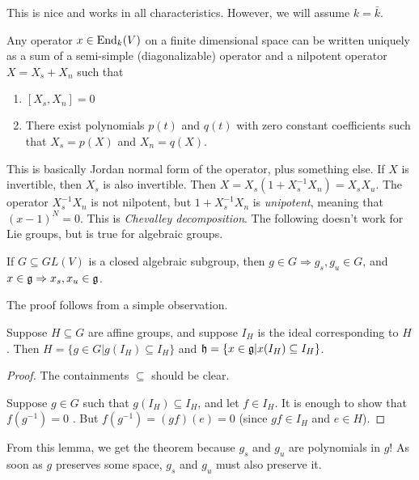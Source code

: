 This is nice and works in all characteristics. However, we will assume $k=\bar k$.
\begin{theorem}
 Any operator $x\in \operatorname{End}_k(V)$ on a finite dimensional space can be written uniquely as a sum of a semi-simple (diagonalizable) operator and a nilpotent operator $X=X_s+X_n$ such that
 \begin{enumerate}
  \item $[X_s,X_n]=0$
  \item There exist polynomials $p(t)$ and $q(t)$ with zero constant coefficients such that $X_s=p(X)$ and $X_n=q(X)$.
 \end{enumerate}
\end{theorem}
This is basically Jordan normal form of the operator, plus something else. If $X$ is invertible, then $X_s$ is also invertible. Then $X=X_s(1+X_s^{-1}X_n)=X_sX_u$. The operator $X_s^{-1}X_n$ is not nilpotent, but $1+X_s^{-1}X_n$ is \emph{unipotent}, meaning that $(x-1)^N=0$. This is \emph{Chevalley decomposition}. The following doesn't work for Lie groups, but is true for algebraic groups.
\begin{theorem}
 If $G\subseteq GL(V)$ is a closed algebraic subgroup, then $g\in G\Rightarrow g_s,g_u\in G$, and $x\in \mathfrak{g}\Rightarrow x_s,x_u\in \mathfrak{g}$.
\end{theorem}
The proof follows from a simple observation.
\begin{lemma}
 Suppose $H\subseteq G$ are affine groups, and suppose $I_H$ is the ideal corresponding to $H$. Then $H=\{g\in G|g(I_H)\subseteq I_H\}$ and $\mathfrak{h}=\{x\in \mathfrak{g}|x(I_H)\subseteq I_H\}$.
\end{lemma}
\begin{proof}
 The containments $\subseteq$ should be clear.
 
 Suppose $g\in G$ such that $g(I_H)\subseteq I_H$, and let $f\in I_H$. It is enough to show that $f(g^{-1})=0$ . But $f(g^{-1})=(gf)(e)=0$ (since $gf\in I_H$ and $e\in H$).
\end{proof}
From this lemma, we get the theorem because $g_s$ and $g_u$ are polynomials in $g$! As soon as $g$ preserves some space, $g_s$ and $g_u$ must also preserve it. 


